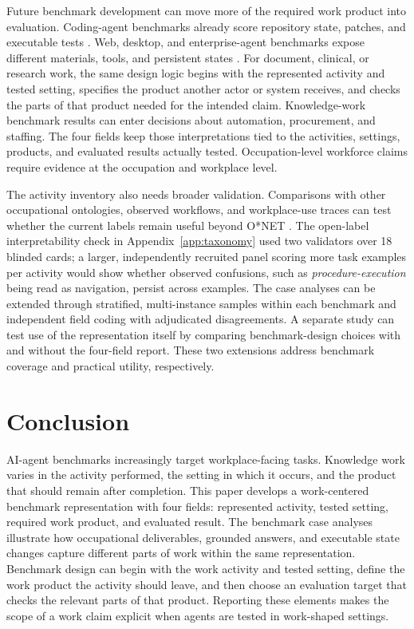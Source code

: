 \documentclass[10pt]{article}
\begin{document}
Future benchmark development can move more of the required work product into evaluation. Coding-agent benchmarks already score repository state, patches, and executable tests \citep{jimenez2024swebench,kottamasu2026apex}. Web, desktop, and enterprise-agent benchmarks expose different materials, tools, and persistent states \citep{zhou2023webarena,xie2024osworld,drouin2024workarena}. For document, clinical, or research work, the same design logic begins with the represented activity and tested setting, specifies the product another actor or system receives, and checks the parts of that product needed for the intended claim. Knowledge-work benchmark results can enter decisions about automation, procurement, and staffing. The four fields keep those interpretations tied to the activities, settings, products, and evaluated results actually tested. Occupation-level workforce claims require evidence at the occupation and workplace level.

The activity inventory also needs broader validation. Comparisons with other occupational ontologies, observed workflows, and workplace-use traces can test whether the current labels remain useful beyond O{*}NET \citep{esco2022v111,handa2025economic}. The open-label interpretability check in Appendix~\ref{app:taxonomy} used two validators over 18 blinded cards; a larger, independently recruited panel scoring more task examples per activity would show whether observed confusions, such as \emph{procedure-execution} being read as navigation, persist across examples. The case analyses can be extended through stratified, multi-instance samples within each benchmark and independent field coding with adjudicated disagreements. A separate study can test use of the representation itself by comparing benchmark-design choices with and without the four-field report. These two extensions address benchmark coverage and practical utility, respectively.

\section{Conclusion}
\label{sec:conclusion}

AI-agent benchmarks increasingly target workplace-facing tasks. Knowledge work varies in the activity performed, the setting in which it occurs, and the product that should remain after completion.
This paper develops a work-centered benchmark representation with four fields: represented activity, tested setting, required work product, and evaluated result.
The benchmark case analyses illustrate how occupational deliverables, grounded answers, and executable state changes capture different parts of work within the same representation.
Benchmark design can begin with the work activity and tested setting, define the work product the activity should leave, and then choose an evaluation target that checks the relevant parts of that product.
Reporting these elements makes the scope of a work claim explicit when agents are tested in work-shaped settings.
\end{document}
